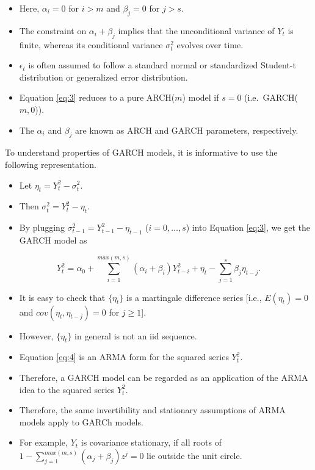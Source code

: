 \documentclass[]{book}
\providecommand{\tightlist}{%
  \setlength{\itemsep}{0pt}\setlength{\parskip}{0pt}}
\begin{document}
\begin{itemize}
\item
  Here, \(\alpha_i=0\) for \(i>m\) and \(\beta_j =0\) for \(j>s.\)
\item
  The constraint on \(\alpha_i+\beta_j\) implies that the unconditional variance of \(Y_t\) is finite, whereas its conditional variance \(\sigma_t^2\) evolves over time.
\item
  \(\epsilon_t\) is often assumed to follow a standard normal or standardized Student-t distribution or generalized error distribution.
\item
  Equation \ref{eq:3} reduces to a pure ARCH(\(m\)) model if \(s = 0\) (i.e.~GARCH(\(m,0\))).
\item
  The \(\alpha_i\) and \(\beta_j\) are known as ARCH and GARCH parameters, respectively.
\end{itemize}

To understand properties of GARCH models, it is informative to use the following representation.

\begin{itemize}
\tightlist
\item
  Let \(\eta_t = Y_t^2 − \sigma_t^2.\)
\item
  Then \(\sigma_t^2= Y_t^2 −\eta_t.\)
\item
  By plugging \(\sigma_{t-1}^2= Y_{t-1}^2 −\eta_{t-1}\) (\(i=0,\dots,s\)) into Equation \ref{eq:3}, we get the GARCH model as
\end{itemize}

\begin{equation} \label{eq:4}
Y_t^2 =\alpha_0+\sum_{i=1}^{max(m,s)}(\alpha_i+\beta_i)Y_{t-i}^2+\eta_t-\sum_{j=1}^s\beta_j\eta_{t-j}.
\end{equation}

\begin{itemize}
\tightlist
\item
  It is easy to check that \(\{\eta_t \}\) is a martingale difference series {[}i.e., \(E(\eta_t ) = 0\) and \(cov(\eta_t , \eta_{t-j} ) = 0\) for \(j\geq 1\){]}.
\item
  However, \(\{\eta_t \}\) in general is not an iid sequence.
\item
  Equation \ref{eq:4} is an ARMA form for the squared series \(Y_t^2\).
\item
  Therefore, a GARCH model can be regarded as an application of the ARMA idea to the squared series \(Y_t^2\).
\item
  Therefore, the same invertibility and stationary assumptions of ARMA models apply to GARCh models.
\item
  For example, \(Y_t\) is covariance stationary, if all roots of \(1-\sum_{j=1}^{max(m,s)}(\alpha_j+\beta_j)z^j=0\) lie outside the unit circle.
\end{itemize}
\end{document}
